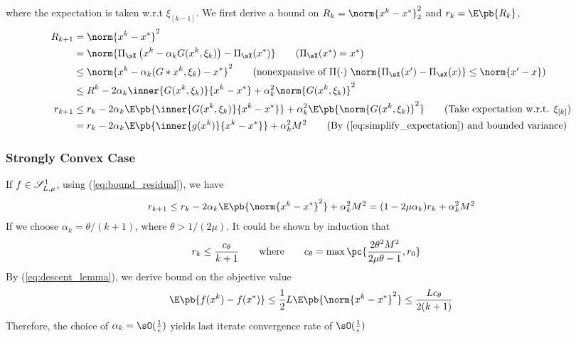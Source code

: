 \documentclass[../summary.tex]{subfiles}
\begin{document}
where the expectation is taken w.r.t $\xi_{[k-1]}$. We first derive a bound on $R_k = \norm{x^k-x^*}_2^2$ and $r_k = \E\pb{R_k}$,
\begin{align*}
    R_{k+1}
        &= \norm{x^k-x^*}^2 \\
        &= \norm{ \Pi_{\sX}\left( x^k - \alpha_k G(x^k,\xi_k) \right) - \Pi_{\sX}(x^*)  }
            \tag{$\Pi_{\sX}(x^*) = x^*$} \\
        &\leq \norm{ x^k - \alpha_k(G*x^k,\xi_k) - x^* }^2
            \tag{nonexpansive of $\Pi(\cdot)$ $\norm{\Pi_{\sX}(x')-\Pi_{\sX}(x)} \leq \norm{x'-x}$} \\ 
        &\leq R^k - 2\alpha_k\inner{G(x^k,\xi_k)}{x^k-x^*} + \alpha_k^2\norm{G(x^k,\xi_k)}^2 \\
    r_{k+1}
        &\leq r_k - 2\alpha_k \E\pb{ \inner{G(x^k,\xi_k)}{x^k-x^*} } + \alpha_k^2 \E\pb{ \norm{G(x^k,\xi_k)}^2 }
            \tag{Take expectation w.r.t. $\xi_{[k]}$} \\
        &= r_k - 2\alpha_k \E\pb{\inner{g(x^k)}{x^k-x^*}} + \alpha_k^2 M^2
            \tag{By (\ref{eq:simplify_expectation}) and bounded variance}
\end{align*}

\subsubsection{Strongly Convex Case}

If $f\in\mathscr{S}_{L,\mu}^1$, using (\ref{eq:bound_residual}), we have
\begin{align*}
    r_{k+1}
        \leq r_k - 2\alpha_k \E\pb{\norm{x^k-x^*}^2} + \alpha_k^2 M^2
        = (1-2\mu \alpha_k ) r_k + \alpha_k^2M^2
\end{align*}
If we choose $\alpha_k = \theta/(k+1)$, where $\theta > 1/(2\mu)$. It could be shown by induction that \cite{nemirovskiRobustStochasticApproximation2009}
\begin{align*}
    r_k 
        &\leq \frac{c_{\theta}}{k+1}
            \quad\quad\text{where}\quad\quad
            c_{\theta} = \max\pc{
                \frac{2\theta^2M^2}{2\mu\theta - 1}, r_0
            }
\end{align*}
By (\ref{eq:descent_lemma}), we derive bound on the objective value
\begin{align*}
    \E\pb{f(x^k) - f(x^*)}
        \leq \frac{1}{2} L \E\pb{\norm{x^k-x^*}^2}
        \leq \frac{Lc_{\theta}}{2(k+1)}
\end{align*}
Therefore, the choice of $\alpha_k=\sO(\frac{1}{\epsilon})$ yields last iterate convergence rate of $\sO(\frac{1}{\epsilon})$
\end{document}
